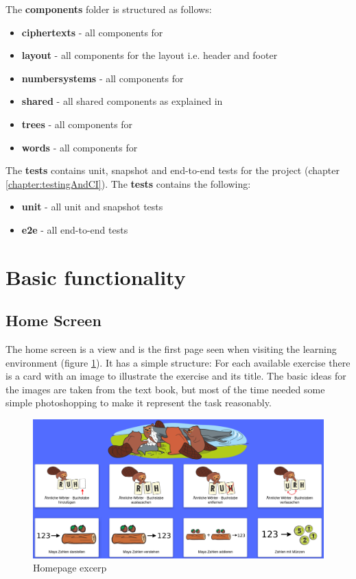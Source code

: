 The \textbf{components} folder is structured as follows:

\begin{itemize}
    \item \textbf{ciphertexts} - all components for 
    \item \textbf{layout} - all components for the layout i.e. header and footer
    \item \textbf{numbersystems} - all components for 
    \item \textbf{shared} - all shared components as explained in 
    \item \textbf{trees} - all components for 
    \item \textbf{words} - all components for 
\end{itemize}

The \textbf{tests} contains unit, snapshot and end-to-end tests for the project (chapter \ref{chapter:testingAndCI}). The \textbf{tests} contains the following:

\begin{itemize}
    \item \textbf{unit} - all unit and snapshot tests
    \item \textbf{e2e} - all end-to-end tests
\end{itemize}

\section{Basic functionality}
\label{section:basicFunctionality}

\subsection{Home Screen}
The home screen is a view and is the first page seen when visiting the learning environment (figure \ref{fig:homepage}). It has a simple structure: For each available exercise there is a card with an image to illustrate the exercise and its title. The basic ideas for the images are taken from the text book, but most of the time needed some simple photoshopping to make it represent the task reasonably.

\begin{figure} 
    \centering
    \includegraphics[width=1.0 \columnwidth]{figures/homepage.png}
    \caption{Homepage excerp} 
    \label{fig:homepage} 
\end{figure}

